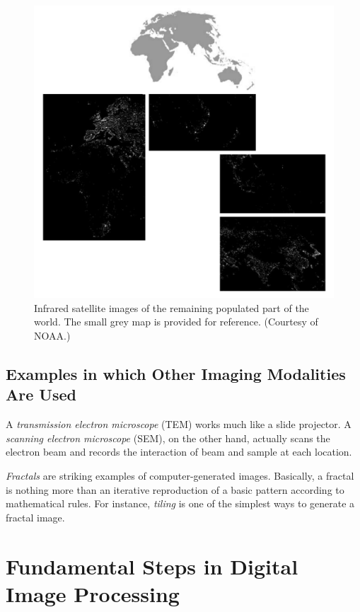 \documentclass[a4paper,10pt,twoside]{book}
\begin{document}
\begin{figure}[htbp]
    \centering
    \includegraphics[width=\linewidth]{Figure1 13.jpeg}
    \caption{Infrared satellite images of the remaining populated part of the world. The small grey map is provided for reference. (Courtesy of NOAA.)}
    \label{Figure:1.13}
\end{figure}

\subsection{Examples in which Other Imaging Modalities Are Used}

A \textit{transmission electron microscope} (TEM) works much like a slide projector. A \textit{scanning electron microscope} (SEM), on the other hand, actually scans the electron beam and records the interaction of beam and sample at each location.

\textit{Fractals} are striking examples of computer-generated images. Basically, a fractal is nothing more than an iterative reproduction of a basic pattern according to mathematical rules. For instance, \textit{tiling} is one of the simplest ways to generate a fractal image.

\section{Fundamental Steps in Digital Image Processing}

\end{document}
